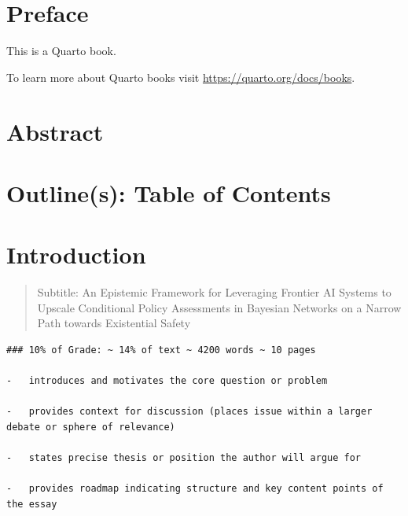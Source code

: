 \documentclass[12pt,a4paper]{report}
\begin{document}


\tableofcontents




\chapter*{Preface}\label{preface}


This is a Quarto book.

To learn more about Quarto books visit
\url{https://quarto.org/docs/books}.


\chapter*{Abstract}\label{sec-Abstract}



\chapter*{Outline(s): Table of Contents}\label{sec-ToC}



\chapter{Introduction}\label{introduction}

\begin{quote}
Subtitle: An Epistemic Framework for Leveraging Frontier AI Systems to
Upscale Conditional Policy Assessments in Bayesian Networks on a Narrow
Path towards Existential Safety
\end{quote}

\begin{verbatim}
### 10% of Grade: ~ 14% of text ~ 4200 words ~ 10 pages

-   introduces and motivates the core question or problem

-   provides context for discussion (places issue within a larger debate or sphere of relevance)

-   states precise thesis or position the author will argue for

-   provides roadmap indicating structure and key content points of the essay
\end{verbatim}
\end{document}
